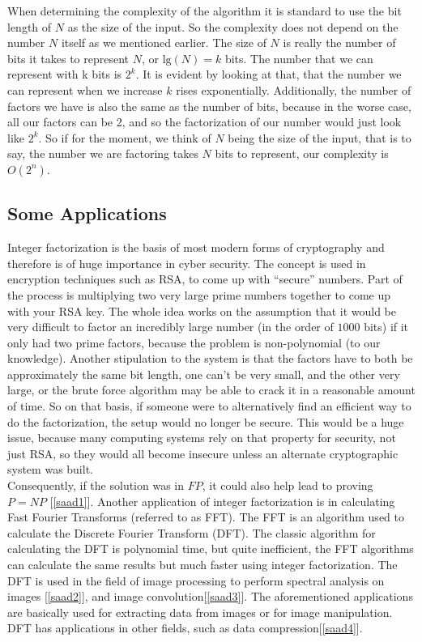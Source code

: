 	When determining the complexity of the algorithm it is standard to use the bit length of $N$ as the size of the input. So the complexity does not depend on the number $N$ itself as we mentioned earlier. The size of $N$ is really the number of bits it takes to represent $N$, or $\text{lg}(N) = k$ bits. The number that we can represent with k bits is $2^k$. It is evident by looking at that, that the number we can represent when we increase $k$ rises exponentially. Additionally, the number of factors we have is also the same as the number of bits, because in the worse case, all our factors can be 2, and so the factorization of our number would just look like $2^k$. So if for the moment, we think of $N$ being the size of the input, that is to say, the number we are factoring takes $N$ bits to represent, our complexity is $O(2^n)$.


\subsection{Some Applications}
	Integer factorization is the basis of most modern forms of cryptography and therefore is of huge importance in cyber security. The concept is used in encryption techniques such as RSA, to come up with “secure” numbers. Part of the process is multiplying two very large prime numbers together to come up with your RSA key. The whole idea works on the assumption that it would be very difficult to factor an incredibly large number (in the order of $1000$ bits) if it only had two prime factors, because the problem is non-polynomial (to our knowledge). Another stipulation to the system is that the factors have to both be approximately the same bit length, one can’t be very small, and the other very large, or the brute force algorithm may be able to crack it in a reasonable amount of time. So on that basis, if someone were to alternatively find an efficient way to do the factorization, the setup would no longer be secure. This would be a huge issue, because many computing systems rely on that property for security, not just RSA, so they would all become insecure unless an alternate cryptographic system was built. \\ 

	Consequently, if the solution was in $FP$, it could also help lead to proving $P=NP$ [\ref{saad1}]. Another application of integer factorization is in calculating Fast Fourier Transforms (referred to as FFT). The FFT is an algorithm used to calculate the Discrete Fourier Transform (DFT). The classic algorithm for calculating the DFT is polynomial time, but quite inefficient, the FFT algorithms can calculate the same results but much faster using integer factorization. The DFT is used in the field of image processing to perform spectral analysis on images [\ref{saad2}], and image convolution[\ref{saad3}]. The aforementioned applications are basically used for extracting data from images or for image manipulation. DFT has applications in other fields, such as data compression[\ref{saad4}].